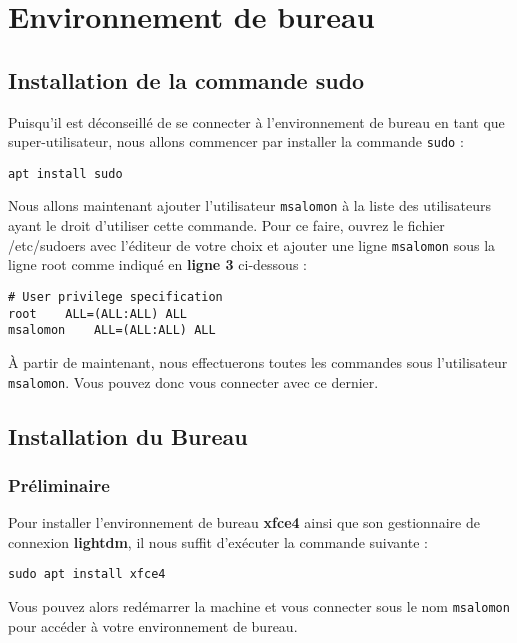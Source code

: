 \chapter{Environnement de bureau}

\section{Installation de la commande sudo}

Puisqu'il est déconseillé de se connecter à l'environnement de bureau en tant que super-utilisateur, nous allons commencer par installer la commande \texttt{sudo} :

\begin{lstlisting}
apt install sudo
\end{lstlisting}

Nous allons maintenant ajouter l'utilisateur \texttt{msalomon} à la liste des utilisateurs ayant le droit d'utiliser cette commande. Pour ce faire, ouvrez le fichier /etc/sudoers avec l'éditeur de votre choix et ajouter une ligne \texttt{msalomon} sous la ligne root comme indiqué en \textbf{ligne 3} ci-dessous :

\begin{lstlisting}[style=tf]
# User privilege specification
root	ALL=(ALL:ALL) ALL
msalomon	ALL=(ALL:ALL) ALL
\end{lstlisting}

À partir de maintenant, nous effectuerons toutes les commandes sous l'utilisateur \texttt{msalomon}. Vous pouvez donc vous connecter avec ce dernier.

\section{Installation du Bureau}

\subsection{Préliminaire}

Pour installer l'environnement de bureau \textbf{xfce4} ainsi que son gestionnaire de connexion \textbf{lightdm}, il nous suffit d'exécuter la commande suivante :

\begin{lstlisting}
sudo apt install xfce4
\end{lstlisting}

Vous pouvez alors redémarrer la machine et vous connecter sous le nom \texttt{msalomon} pour accéder à votre environnement de bureau.

